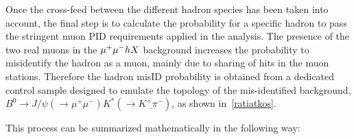 Once the cross-feed between the different hadron species has been taken into account, the final step is to calculate the probability for
a specific hadron to pass the stringent muon \gls{PID} requirements applied in the analysis. The presence of the two real muons in the ${\mu^+\mu^-} h X$
background increases the probability to misidentify the hadron as a muon, mainly due to sharing of hits in the muon stations. Therefore the hadron misID probability is obtained from a dedicated control sample designed to emulate the topology of the mis-identified background,
 $B^{0} \rightarrow J/\psi(\rightarrow \mu^{+} \mu^{-}) K^{*}(\rightarrow \underline{K^{+} \pi^{-}})$, as shown in~\autoref{ratiatkos}.


This process can be summarized mathematically in the following way:

